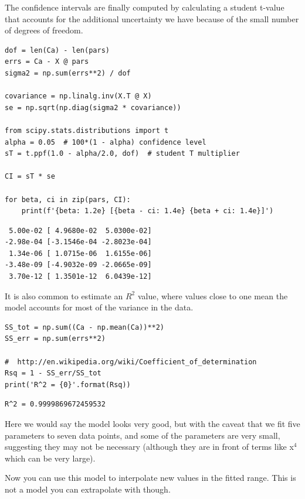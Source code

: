 \documentclass[11pt]{article}
\begin{document}
The confidence intervals are finally computed by calculating a student t-value that accounts for the additional uncertainty we have because of the small number of degrees of freedom.

\begin{verbatim}
dof = len(Ca) - len(pars)
errs = Ca - X @ pars
sigma2 = np.sum(errs**2) / dof

covariance = np.linalg.inv(X.T @ X)
se = np.sqrt(np.diag(sigma2 * covariance))

from scipy.stats.distributions import t
alpha = 0.05  # 100*(1 - alpha) confidence level
sT = t.ppf(1.0 - alpha/2.0, dof)  # student T multiplier

CI = sT * se

for beta, ci in zip(pars, CI):
    print(f'{beta: 1.2e} [{beta - ci: 1.4e} {beta + ci: 1.4e}]')
\end{verbatim}

\begin{verbatim}
 5.00e-02 [ 4.9680e-02  5.0300e-02]
-2.98e-04 [-3.1546e-04 -2.8023e-04]
 1.34e-06 [ 1.0715e-06  1.6155e-06]
-3.48e-09 [-4.9032e-09 -2.0665e-09]
 3.70e-12 [ 1.3501e-12  6.0439e-12]

\end{verbatim}

It is also common to estimate an \(R^2\) value, where values close to one mean the model accounts for most of the variance in the data.

\begin{verbatim}
SS_tot = np.sum((Ca - np.mean(Ca))**2)
SS_err = np.sum(errs**2)

#  http://en.wikipedia.org/wiki/Coefficient_of_determination
Rsq = 1 - SS_err/SS_tot
print('R^2 = {0}'.format(Rsq))
\end{verbatim}

\begin{verbatim}
R^2 = 0.9999869672459532

\end{verbatim}

Here we would say the model looks very good, but with the caveat that we fit five parameters to seven data points, and some of the parameters are very small, suggesting they may not be necessary (although they are in front of terms like x\(^{\text{4}}\) which can be very large).

Now you can use this model to interpolate new values in the fitted range. This is not a model you can extrapolate with though.
\end{document}
